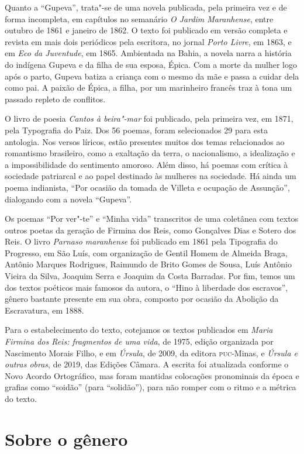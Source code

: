 Quanto a ``Gupeva'', trata"-se de uma novela publicada, pela primeira vez
e de forma incompleta, em capítulos no semanário \emph{O Jardim
Maranhense}, entre outubro de 1861 e janeiro de 1862. O texto foi
publicado em versão completa e revista em mais dois periódicos pela
escritora, no jornal \emph{Porto Livre}, em 1863, e em \emph{Eco da
Juventude}, em 1865. Ambientada na Bahia, a novela narra a história do
indígena Gupeva e da filha de sua esposa, Épica. Com a morte da mulher
logo após o parto, Gupeva batiza a criança com o mesmo da mãe e passa a
cuidar dela como pai. A paixão de Épica, a filha, por um marinheiro
francês traz à tona um passado repleto de conflitos.

O livro de poesia \emph{Cantos à beira"-mar} foi publicado, pela primeira
vez, em 1871, pela Typografia do Paiz. Dos 56 poemas, foram selecionados
29 para esta antologia. Nos versos líricos, estão presentes muitos dos
temas relacionados ao romantismo brasileiro, como a exaltação da terra,
o nacionalismo, a idealização e a impossibilidade do sentimento amoroso.
Além disso, há poemas com crítica à sociedade patriarcal e ao papel
destinado às mulheres na sociedade. Há ainda um poema indianista, ``Por
ocasião da tomada de Villeta e ocupação de Assunção'', dialogando com a
novela ``Gupeva''.

Os poemas ``Por ver"-te'' e ``Minha vida'' transcritos de uma coletânea
com textos outros poetas da geração de Firmina dos Reis, como Gonçalves
Dias e Sotero dos Reis. O livro \emph{Parnaso maranhense} foi publicado
em 1861 pela Tipografia do Progresso, em São Luís, com organização de
Gentil Homem de Almeida Braga, Antônio Marques Rodrigues, Raimundo de
Brito Gomes de Sousa, Luís Antônio Vieira da Silva, Joaquim Serra e
Joaquim da Costa Barradas. Por fim, temos um dos textos poéticos mais
famosos da autora, o ``Hino à liberdade dos escravos'', gênero bastante
presente em sua obra, composto por ocasião da Abolição da Escravatura,
em 1888.

Para o estabelecimento do texto, cotejamos os textos publicados em
\emph{Maria Firmina dos Reis: fragmentos de uma vida}, de 1975, edição
organizada por Nascimento Morais Filho, e em \emph{Úrsula}, de 2009, da
editora \textsc{puc}-Minas, e \emph{Úrsula e outras obras}, de 2019, das Edições
Câmara. A escrita foi atualizada conforme o Novo Acordo Ortográfico, mas
foram mantidas colocações pronominais da época e grafias como ``soidão''
(para ``solidão''), para não romper com o ritmo e a métrica do texto.

\section{Sobre o gênero}

